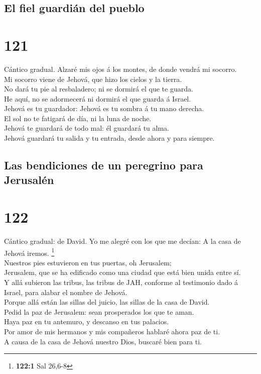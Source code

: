 \hypertarget{el-fiel-guardiuxe1n-del-pueblo}{%
\subsection{El fiel guardián del
pueblo}\label{el-fiel-guardiuxe1n-del-pueblo}}

\hypertarget{section-120}{%
\section{121}\label{section-120}}

 Cántico gradual. Alzaré mis ojos á los montes, de donde
vendrá mi socorro.\\
 Mi socorro viene de Jehová, que hizo los cielos y la
tierra.\\
 No dará tu pie al resbaladero; ni se dormirá el que te
guarda.\\
 He aquí, no se adormecerá ni dormirá el que guarda á
Israel.\\
 Jehová es tu guardador: Jehová es tu sombra á tu mano
derecha.\\
 El sol no te fatigará de día, ni la luna de noche.\\
 Jehová te guardará de todo mal: él guardará tu alma.\\
 Jehová guardará tu salida y tu entrada, desde ahora y
para siempre.

\hypertarget{las-bendiciones-de-un-peregrino-para-jerusaluxe9n}{%
\subsection{Las bendiciones de un peregrino para
Jerusalén}\label{las-bendiciones-de-un-peregrino-para-jerusaluxe9n}}

\hypertarget{section-121}{%
\section{122}\label{section-121}}

 Cántico gradual: de David. Yo me alegré con los que me
decían: A la casa de Jehová iremos. \footnote{\textbf{122:1} Sal 26,6-8}\\
 Nuestros pies estuvieron en tus puertas, oh Jerusalem;\\
 Jerusalem, que se ha edificado como una ciudad que está
bien unida entre sí.\\
 Y allá subieron las tribus, las tribus de JAH, conforme
al testimonio dado á Israel, para alabar el nombre de Jehová.\\
 Porque allá están las sillas del juicio, las sillas de la
casa de David.\\
 Pedid la paz de Jerusalem: sean prosperados los que te
aman.\\
 Haya paz en tu antemuro, y descanso en tus palacios.\\
 Por amor de mis hermanos y mis compañeros hablaré ahora
paz de ti.\\
 A causa de la casa de Jehová nuestro Dios, buscaré bien
para ti.


